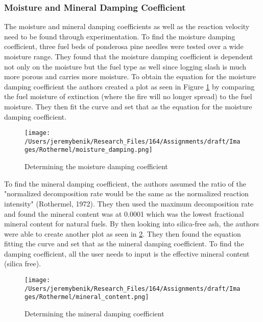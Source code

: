 \documentclass{article}
\begin{document}
 \subsubsection{Moisture and Mineral Damping Coefficient}
\indent The moisture and mineral damping coefficients as well as the reaction velocity need to be found through experimentation. To find the moisture damping coefficient, three fuel beds of ponderosa pine needles were tested over a wide moisture range. They found that the moisture damping coefficient is dependent not only on the moisture but the fuel type as well since logging slash is much more porous and carries more moisture. To obtain the equation for the moisture damping coefficient the authors created a plot as seen in Figure \ref{rothermel_moisture_damping} by comparing the fuel moisture of extinction (where the fire will no longer spread) to the fuel moisture. They then fit the curve and set that as the equation for the moisture damping coefficient. 
 \begin{figure}
  \texttt{[image: /Users/jeremybenik/Research\_Files/164/Assignments/draft/Images/Rothermel/moisture\_damping.png]}
  \caption{Determining the moisture damping coefficient}
  \label{rothermel_moisture_damping}
\end{figure}

 \indent To find the mineral damping coefficient, the authors assumed the ratio of the "normalized decomposition rate would be the same as the normalized reaction intensity" (Rothermel, 1972). They then used the maximum decomposition rate and found the mineral content was at 0.0001 which was the lowest fractional mineral content for natural fuels. By then looking into silica-free ash, the authors were able to create another plot as seen in \ref{rothermel_mineral_damping}. They then found the equation fitting the curve and set that as the mineral damping coefficient. To find the damping coefficient, all the user needs to input is the effective mineral content (silica free). \\
 \begin{figure}
  \texttt{[image: /Users/jeremybenik/Research\_Files/164/Assignments/draft/Images/Rothermel/mineral\_content.png]}
  \caption{Determining the mineral damping coefficient }
  \label{rothermel_mineral_damping}
\end{figure}
\end{document}
